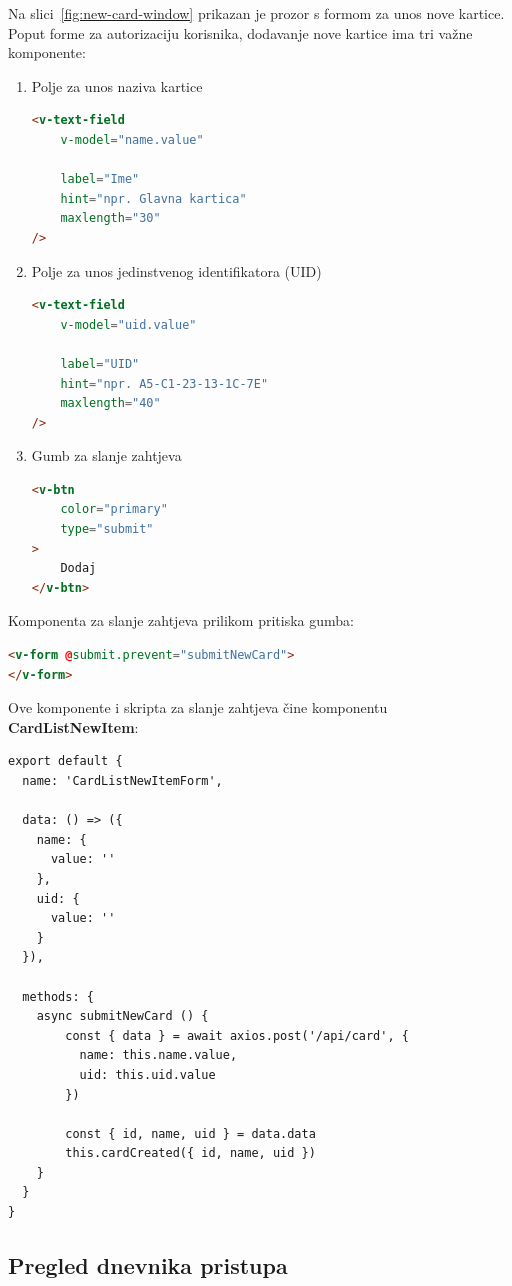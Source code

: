 Na slici~\ref{fig:new-card-window} prikazan je prozor s formom za unos nove kartice.
Poput forme za autorizaciju korisnika, dodavanje nove kartice ima tri važne komponente:

\begin{enumerate}
    \item Polje za unos naziva kartice
        \begin{lstlisting}[language=HTML]
<v-text-field
    v-model="name.value"

    label="Ime"
    hint="npr. Glavna kartica"
    maxlength="30"
/>
        \end{lstlisting}
    \item Polje za unos jedinstvenog identifikatora (UID)
        \begin{lstlisting}[language=HTML]
<v-text-field
    v-model="uid.value"

    label="UID"
    hint="npr. A5-C1-23-13-1C-7E"
    maxlength="40"
/>
        \end{lstlisting}
    \item Gumb za slanje zahtjeva
        \begin{lstlisting}[language=HTML]
<v-btn
    color="primary"
    type="submit"
>
    Dodaj
</v-btn>
        \end{lstlisting}
\end{enumerate}

Komponenta za slanje zahtjeva prilikom pritiska gumba:

\begin{lstlisting}[language=HTML]
<v-form @submit.prevent="submitNewCard">
</v-form>
\end{lstlisting}

Ove komponente i skripta za slanje zahtjeva čine komponentu \textbf{CardListNewItem}:

\begin{lstlisting}
export default {
  name: 'CardListNewItemForm',

  data: () => ({
    name: {
      value: ''
    },
    uid: {
      value: ''
    }
  }),

  methods: {
    async submitNewCard () {
        const { data } = await axios.post('/api/card', {
          name: this.name.value,
          uid: this.uid.value
        })

        const { id, name, uid } = data.data
        this.cardCreated({ id, name, uid })
    }
  }
}
\end{lstlisting}

\subsection{Pregled dnevnika pristupa}


